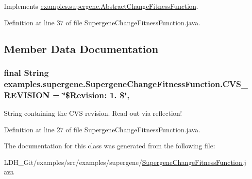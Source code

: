 Implements \hyperlink{classexamples_1_1supergene_1_1_abstract_change_fitness_function_adf1b5ef070f57b87234a09fa075587b2}{examples.\-supergene.\-Abstract\-Change\-Fitness\-Function}.



Definition at line 37 of file Supergene\-Change\-Fitness\-Function.\-java.



\subsection{Member Data Documentation}
\hypertarget{classexamples_1_1supergene_1_1_supergene_change_fitness_function_a0353fac3c56a6b9cd7665a85ed693f64}{
\subsubsection[{C\-V\-S\-\_\-\-R\-E\-V\-I\-S\-I\-O\-N}]{\setlength{\rightskip}{0pt plus 5cm}final String examples.\-supergene.\-Supergene\-Change\-Fitness\-Function.\-C\-V\-S\-\_\-\-R\-E\-V\-I\-S\-I\-O\-N = \char`\"{}\$Revision\-: 1. \$\char`\"{}\hspace{0.3cm}{\ttfamily [static]}, {\ttfamily [private]}}}\label{classexamples_1_1supergene_1_1_supergene_change_fitness_function_a0353fac3c56a6b9cd7665a85ed693f64}
String containing the C\-V\-S revision. Read out via reflection! 

Definition at line 27 of file Supergene\-Change\-Fitness\-Function.\-java.



The documentation for this class was generated from the following file\-:\begin{DoxyCompactItemize}
\item 
L\-D\-H\-\_\-\-Git/examples/src/examples/supergene/\hyperlink{_supergene_change_fitness_function_8java}{Supergene\-Change\-Fitness\-Function.\-java}\end{DoxyCompactItemize}
